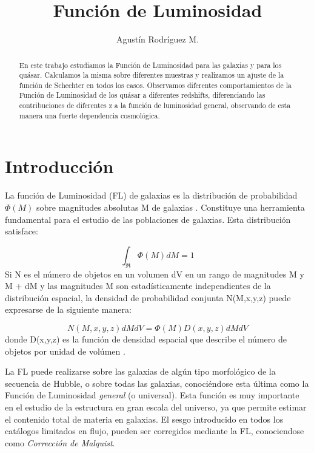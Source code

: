 \documentclass[a4paper,10pt]{article}
\title{Funci\'on de Luminosidad}
\author{Agustín Rodríguez M.}
\begin{document}
\maketitle

\begin{abstract}
En este trabajo estudiamos la Funci\'on de Luminosidad para las galaxias y para los qu\'asar. Calculamos la misma sobre diferentes muestras y realizamos un ajuste de la funci\'on de Schechter en todos los casos. Observamos diferentes comportamientos de la Funci\'on de Luminosidad de los qu\'asar a diferentes redshifts, diferenciando las contribuciones de diferentes z a la funci\'on de luminosidad general, observando de esta manera una fuerte dependencia cosmol\'ogica. 
\end{abstract}



\section{Introducci\'on}
La funci\'on de Luminosidad (FL) de galaxias es la distribuci\'on de probabilidad $\Phi(M)$ sobre magnitudes absolutas M de galaxias \citep{Binggeli1988}. Constituye una herramienta fundamental para el estudio de las poblaciones de galaxias. Esta distribuci\'on satisface: 

\begin{equation}
 \int_{\Re}\Phi(M)dM=1
\end{equation}
Si N es el n\'umero de objetos en un volumen dV en un rango de magnitudes M y M + dM y las magnitudes M son estad\'isticamente independientes de la distribuci\'on espacial, la densidad de probabilidad conjunta N(M,x,y,z) puede expresarse de la siguiente manera:

\begin{equation}
 N(M,x,y,z)dMdV=\Phi(M)D(x,y,z)dMdV
\end{equation}
donde D(x,y,z) es la funci\'on de densidad espacial que describe el n\'umero de objetos por unidad de vol\'umen \citep{Binggeli1988}. 





La FL puede realizarse sobre las galaxias de alg\'un tipo morfol\'ogico de la secuencia de Hubble, o sobre todas las galaxias, conoci\'endose esta \'ultima como la Funci\'on de Luminosidad \textit{general} (o universal). Esta funci\'on es muy importante en el estudio de la estructura en gran escala del universo, ya que permite estimar el contenido total de materia en galaxias. El sesgo introducido en todos los cat\'alogos limitados en flujo, pueden ser corregidos mediante la FL, conociendose como \textit{Correcci\'on de Malquist}. 
\end{document}
